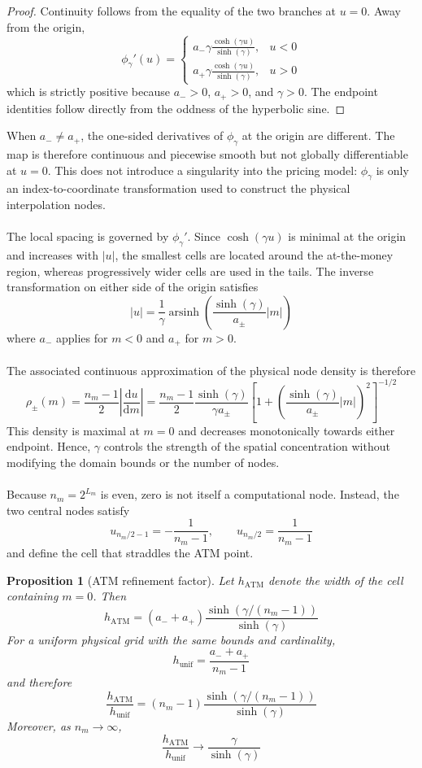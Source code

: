 \documentclass{article}
\numberwithin{equation}{subsection}
\newtheorem{proposition}[theorem]{Proposition}
\theoremstyle{definition}
\theoremstyle{remark}
\begin{document}
\begin{proof}
Continuity follows from the equality of the two branches at \(u=0\). Away from the origin,
\[
\phi_\gamma'(u)
=
\begin{cases}
\displaystyle
a_-\gamma\frac{\cosh(\gamma u)}{\sinh(\gamma)},
& u<0
\\[1.2ex]
\displaystyle
a_+\gamma\frac{\cosh(\gamma u)}{\sinh(\gamma)},
& u>0
\end{cases}
\]
which is strictly positive because \(a_->0\), \(a_+>0\), and \(\gamma>0\). The endpoint identities follow directly from the oddness of the hyperbolic sine.
\end{proof}
When \(a_-\neq a_+\), the one-sided derivatives of \(\phi_\gamma\) at the origin are different. The map is therefore continuous and piecewise smooth but not globally differentiable at \(u=0\). This does not introduce a singularity into the pricing model: \(\phi_\gamma\) is only an index-to-coordinate transformation used to construct the physical interpolation nodes.\\
\\
The local spacing is governed by \(\phi_\gamma'\). Since \(\cosh(\gamma u)\) is minimal at the origin and increases with \(\lvert u\rvert\), the smallest cells are located around the at-the-money region, whereas progressively wider cells are used in the tails. The inverse transformation on either side of the origin satisfies
\[
\lvert u\rvert
=
\frac{1}{\gamma}
\operatorname{arsinh}
\left(
\frac{\sinh(\gamma)}{a_\pm}\lvert m\rvert
\right)
\]
where \(a_-\) applies for \(m<0\) and \(a_+\) for \(m>0\).\\
\\
The associated continuous approximation of the physical node density is therefore
\[
\rho_\pm(m)
=
\frac{n_m-1}{2}
\left\lvert\frac{\mathrm{d}u}{\mathrm{d}m}\right\rvert
=
\frac{n_m-1}{2}
\frac{\sinh(\gamma)}{\gamma a_\pm}
\left[
1+
\left(
\frac{\sinh(\gamma)}{a_\pm}\lvert m\rvert
\right)^2
\right]^{-1/2}
\]
This density is maximal at \(m=0\) and decreases monotonically towards either endpoint. Hence, \(\gamma\) controls the strength of the spatial concentration without modifying the domain bounds or the number of nodes.\\
\\
Because \(n_m=2^{L_m}\) is even, zero is not itself a computational node. Instead, the two central nodes satisfy
\[
u_{n_m/2-1}=-\frac{1}{n_m-1},
\qquad
u_{n_m/2}=\frac{1}{n_m-1}
\]
and define the cell that straddles the ATM point.
\begin{proposition}[ATM refinement factor]
Let \(h_{\mathrm{ATM}}\) denote the width of the cell containing \(m=0\). Then
\[
h_{\mathrm{ATM}}
=
(a_-+a_+)
\frac{\sinh\left(\gamma/(n_m-1)\right)}
     {\sinh(\gamma)}
\]
For a uniform physical grid with the same bounds and cardinality,
\[
h_{\mathrm{unif}}
=
\frac{a_-+a_+}{n_m-1}
\]
and therefore
\[
\frac{h_{\mathrm{ATM}}}{h_{\mathrm{unif}}}
=
(n_m-1)
\frac{\sinh\left(\gamma/(n_m-1)\right)}
     {\sinh(\gamma)}
\]
Moreover, as \(n_m\rightarrow\infty\),
\[
\frac{h_{\mathrm{ATM}}}{h_{\mathrm{unif}}}
\longrightarrow
\frac{\gamma}{\sinh(\gamma)}
\]
\end{proposition}
\end{document}
